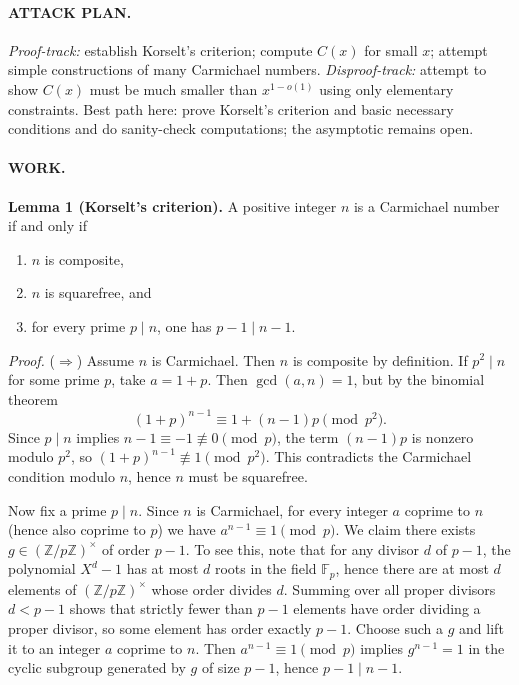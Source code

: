 \paragraph{ATTACK PLAN.}
\emph{Proof-track:} establish Korselt's criterion; compute $C(x)$ for small $x$; attempt simple constructions of many Carmichael numbers.
\emph{Disproof-track:} attempt to show $C(x)$ must be much smaller than $x^{1-o(1)}$ using only elementary constraints.
Best path here: prove Korselt's criterion and basic necessary conditions and do sanity-check computations; the asymptotic remains open.

\paragraph{WORK.}
\textbf{Lemma 1 (Korselt's criterion).}
A positive integer $n$ is a Carmichael number if and only if
\begin{enumerate}
\item $n$ is composite,
\item $n$ is squarefree, and
\item for every prime $p\mid n$, one has $p-1\mid n-1$.
\end{enumerate}

\emph{Proof.}
($\Rightarrow$) Assume $n$ is Carmichael.
Then $n$ is composite by definition.
If $p^2\mid n$ for some prime $p$, take $a=1+p$.
Then $\gcd(a,n)=1$, but by the binomial theorem
\[
(1+p)^{n-1}\equiv 1+(n-1)p \pmod{p^2}.
\]
Since $p\mid n$ implies $n-1\equiv -1\not\equiv 0\pmod p$, the term $(n-1)p$ is nonzero modulo $p^2$, so $(1+p)^{n-1}\not\equiv 1\pmod{p^2}$.
This contradicts the Carmichael condition modulo $n$, hence $n$ must be squarefree.

Now fix a prime $p\mid n$.
Since $n$ is Carmichael, for every integer $a$ coprime to $n$ (hence also coprime to $p$) we have $a^{n-1}\equiv 1\pmod p$.
We claim there exists $g\in(\mathbb{Z}/p\mathbb{Z})^\times$ of order $p-1$.
To see this, note that for any divisor $d$ of $p-1$, the polynomial $X^d-1$ has at most $d$ roots in the field $\mathbb{F}_p$, hence there are at most $d$ elements of $(\mathbb{Z}/p\mathbb{Z})^\times$ whose order divides $d$.
Summing over all proper divisors $d<p-1$ shows that strictly fewer than $p-1$ elements have order dividing a proper divisor, so some element has order exactly $p-1$.
Choose such a $g$ and lift it to an integer $a$ coprime to $n$.
Then $a^{n-1}\equiv 1\pmod p$ implies $g^{n-1}=1$ in the cyclic subgroup generated by $g$ of size $p-1$, hence $p-1\mid n-1$.

